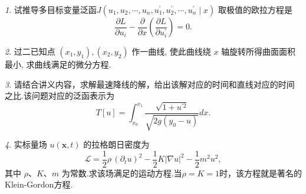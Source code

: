 \documentclass[11pt]{article}
\theoremstyle{remark}
\newtheorem{problem}{}
\begin{document}
\renewcommand{\labelenumi}{(\arabic{enumi})}
\renewcommand{\labelenumii}{(\arabic{enumi}.\arabic{enumii})}



  

\begin{problem}
  试推导多目标变量泛函$J\left(u_1, u_2, \cdots, u_n, u_1^{\prime}, u_2^{\prime}, \cdots, u_n^{\prime} \mid x\right)$
  取极值的欧拉方程是
  $$
  \frac{\partial L}{\partial u_i}-\frac{\partial}{\partial x}\left(\frac{\partial L}{\partial u_i^{\prime}}\right)=0 .
  $$
  \end{problem}

\vspace{2em}

\begin{problem}
  过二已知点 $\left(x_1, y_1\right),\left(x_2, y_2\right)$ 作一曲线, 使此曲线绕 $x$ 轴旋转所得曲面面积最小, 求曲线满足的微分方程.
\end{problem}

\vspace{2em}

\begin{problem}
  请结合讲义内容，求解最速降线的解，给出该解对应的时间和直线对应的时间之比.该问题对应的泛函表示为
  $$
  T[u] = \int_{x_0}^{x_1} \frac{\sqrt{1+u^{\prime 2}}}{\sqrt{2 g\left(y_0-u\right)}} d x .
  $$
\end{problem}

\vspace{2em}

\begin{problem}
实标量场 $u(\mathbf{x},t)$ 的拉格朗日密度为
$$
\mathcal{L}
=\frac12\rho\,(\partial_t u)^2
-\frac12 K|\nabla u|^2
-\frac12 m^2 u^2,
$$
其中 $\rho$、$K$、$m$ 为常数.求该场满足的运动方程.当$\rho=K=1$时，该方程就是著名的Klein-Gordon方程.
\end{problem}

\vspace{2em}
\end{document}
